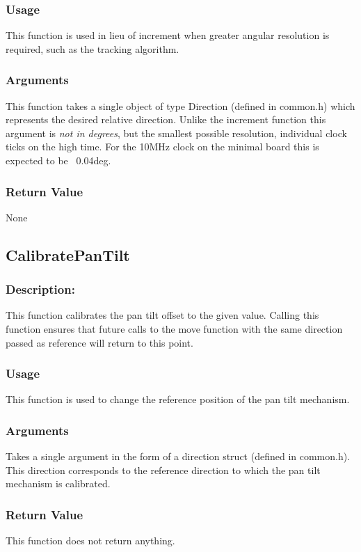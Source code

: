 \documentclass[]{report}
\begin{document}
\subsubsection{Usage}
This function is used in lieu of increment when greater angular resolution is required, such as the tracking algorithm.

\subsubsection{Arguments}
This function takes a single object of type Direction (defined in common.h) which represents the desired relative direction. Unlike the increment function this argument is \emph{not in degrees}, but the smallest possible resolution, individual clock ticks on the high time. For the 10MHz clock on the minimal board this is expected to be ~0.04deg.

\subsubsection{Return Value}
None

\subsection{CalibratePanTilt}
\subsubsection{Description:}
This function calibrates the pan tilt offset to the given value. Calling this function ensures that future calls to the move function with the same direction passed as reference will return to this point. 

\subsubsection{Usage}
This function is used to change the reference position of the pan tilt mechanism.

\subsubsection{Arguments}
Takes a single argument in the form of a direction struct (defined in common.h). This direction corresponds to the reference direction to which the pan tilt mechanism is calibrated.

\subsubsection{Return Value}
This function does not return anything.
\end{document}
